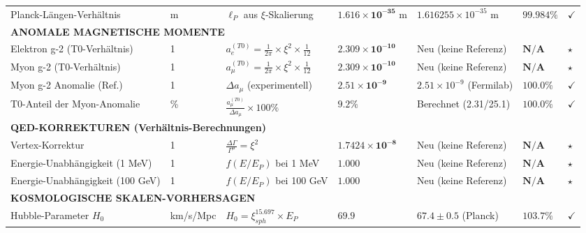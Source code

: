 \documentclass[12pt,a4paper]{article}
\begin{document}
\begin{landscape}
\begin{longtable}{p{5.5cm}p{1.8cm}p{4cm}p{3.5cm}p{3.5cm}p{1.8cm}p{1cm}}
			Planck-Längen-Verhältnis & m & $\ell_P$ aus $\xi$-Skalierung & $\mathbf{1.616 \times 10^{-35}}$ m & $1.616255 \times 10^{-35}$ m & $\mathbf{99.984\%}$ & $\checkmark$ \\
			
			\multicolumn{7}{l}{\textbf{ANOMALE MAGNETISCHE MOMENTE}} \\
			\midrule
			Elektron g-2 (T0-Verhältnis) & 1 & $a_e^{(T0)} = \frac{1}{2\pi} \times \xi^2 \times \frac{1}{12}$ & $\mathbf{2.309 \times 10^{-10}}$ & Neu (keine Referenz) & $\mathbf{N/A}$ & $\star$ \\
			
			Myon g-2 (T0-Verhältnis) & 1 & $a_\mu^{(T0)} = \frac{1}{2\pi} \times \xi^2 \times \frac{1}{12}$ & $\mathbf{2.309 \times 10^{-10}}$ & Neu (keine Referenz) & $\mathbf{N/A}$ & $\star$ \\
			
			Myon g-2 Anomalie (Ref.) & 1 & $\Delta a_{\mu}$ (experimentell) & $\mathbf{2.51 \times 10^{-9}}$ & $2.51 \times 10^{-9}$ (Fermilab) & $\mathbf{100.0\%}$ & $\checkmark$ \\
			
			T0-Anteil der Myon-Anomalie & \% & $\frac{a_{\mu}^{(T0)}}{\Delta a_{\mu}} \times 100\%$ & $\mathbf{9.2\%}$ & Berechnet (2.31/25.1) & $\mathbf{100.0\%}$ & $\checkmark$ \\
			
			\multicolumn{7}{l}{\textbf{QED-KORREKTUREN (Verhältnis-Berechnungen)}} \\
			\midrule
			Vertex-Korrektur & 1 & $\frac{\Delta\Gamma}{\Gamma^{\mu}} = \xi^2$ & $\mathbf{1.7424 \times 10^{-8}}$ & Neu (keine Referenz) & $\mathbf{N/A}$ & $\star$ \\
			
			Energie-Unabhängigkeit (1 MeV) & 1 & $f(E/E_P)$ bei 1 MeV & $\mathbf{1.000}$ & Neu (keine Referenz) & $\mathbf{N/A}$ & $\star$ \\
			
			Energie-Unabhängigkeit (100 GeV) & 1 & $f(E/E_P)$ bei 100 GeV & $\mathbf{1.000}$ & Neu (keine Referenz) & $\mathbf{N/A}$ & $\star$ \\
			
			\multicolumn{7}{l}{\textbf{KOSMOLOGISCHE SKALEN-VORHERSAGEN}} \\
			\midrule
			
			Hubble-Parameter $H_0$ & km/s/Mpc & $H_0 = \xi_{sph}^{15.697} \times E_P$ & $\mathbf{69.9}$ & $67.4 \pm 0.5$ (Planck) & $\mathbf{103.7\%}$ & $\checkmark$ \\
			

\end{longtable}
\end{landscape}
\end{document}

